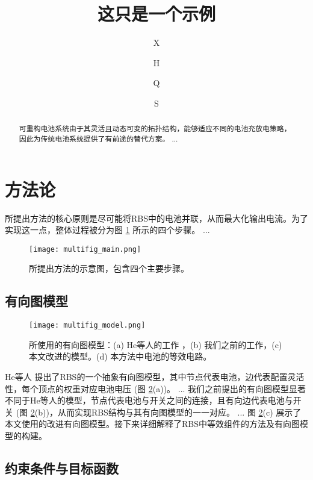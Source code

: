 \documentclass[a4paper,UTF8]{ctexart}
\title{这只是一个示例}
\author[1$\dag$]{X}
\author[1$\dag$]{H}
\author[1*]{Q}
\author[1,2]{S}
\affil[1]{R学院，中国}
\affil[2]{A学院，中国}
\affil[*]{通讯作者邮箱}
\affil[$\dag$]{这些作者对本文贡献相同。}
\begin{document}
\maketitle

\begin{abstract}
可重构电池系统由于其灵活且动态可变的拓扑结构，能够适应不同的电池充放电策略，因此为传统电池系统提供了有前途的替代方案。
...
\end{abstract}

\section{方法论}

所提出方法的核心原则是尽可能将RBS中的电池并联，从而最大化输出电流。为了实现这一点，整体过程被分为图 \ref{multifig:multifig_main} 所示的四个步骤。
...


\begin{figure}[htbp]
    \centering
    \texttt{[image: multifig\_main.png]}
    \caption{
        所提出方法的示意图，包含四个主要步骤。
    }
    \label{multifig:multifig_main}
\end{figure}


\subsection{有向图模型}


\begin{figure}[htbp]
    \centering
    \texttt{[image: multifig\_model.png]}
    \caption{
        所使用的有向图模型：(a) He等人的工作 \cite{heExploringAdaptiveReconfiguration2013}，(b) 我们之前的工作，(c) 本文改进的模型。(d) 本方法中电池的等效电路。
    }
    \label{multifig:multifig_model}
\end{figure}


He等人 \cite{heExploringAdaptiveReconfiguration2013} 提出了RBS的一个抽象有向图模型，其中节点代表电池，边代表配置灵活性，每个顶点的权重对应电池电压 (图 \ref{multifig:multifig_model}(a))。
...
我们之前提出的有向图模型显著不同于He等人的模型，节点代表电池与开关之间的连接，且有向边代表电池与开关 (图 \ref{multifig:multifig_model}(b))，从而实现RBS结构与其有向图模型的一一对应。
...
图 \ref{multifig:multifig_model}(c) 展示了本文使用的改进有向图模型。接下来详细解释了RBS中等效组件的方法及有向图模型的构建。

\subsection{约束条件与目标函数}
\end{document}
